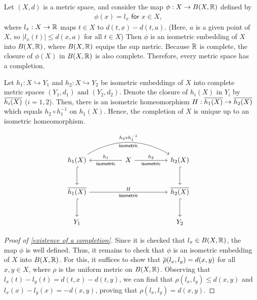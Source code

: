 \begin{thm}\label{existence of a completion}
    Let $(X, d)$ is a metric space, and consider the map $\phi: X\rightarrow B(X, {\mathbb{R}})$ defined by
    \begin{align*}
        \phi(x)=l_x\textsf{ for }x\in X,
    \end{align*}
    where $l_x: X\rightarrow{\mathbb{R}}$ maps $t\in X$ to $d(t, x)-d(t, a)$.
    (Here, $a$ is a given point of $X$, so $|l_x(t)|\leq d(x, a)$ for all $t\in X$)
    Then $\phi$ is an isometric embedding of $X$ into $B(X, {\mathbb{R}})$, where $B(X, {\mathbb{R}})$ equips the sup metric.
    Because ${\mathbb{R}}$ is complete, the closure of $\phi(X)$ in $B(X, {\mathbb{R}})$ is also complete.
    Therefore, every metric space has a completion.
\end{thm}
\begin{thm}\label{uniqueness of a completion}
    Let $h_1: X\hookrightarrow Y_1$ and $h_2: X\hookrightarrow Y_2$ be isometric embeddings of $X$ into complete metric spaces $(Y_1, d_1)$ and $(Y_2, d_2)$.
    Denote the closure of $h_i(X)$ in $Y_i$ by $\overline{h_i(X)}$ ($i=1, 2$).
    Then, there is an isometric homeomorphism $H: \overline{h_1(X)}\rightarrow \overline{h_2(X)}$ which equals $h_2\circ h_1^{-1}$ on $h_1(X)$.
    Hence, the completion of $X$ is unique up to an isometric homeomorphism.

    \begin{equation*}
    \begin{tikzcd}[row sep=large, column sep=huge]
        h_1(X)\arrow[d, hook]
        \arrow[rr, bend left, "h_2\circ h_1^{-1}", "\textsf{isometric}"']
        &
        X
        \arrow[l, "\textsf{isometric}", "h_1"']
        \arrow[r, "h_2", "\textsf{isometric}"']
        &
        h_2(X)\arrow[d, hook]
        \\
        \ol{h_1(X)}
        \arrow[d, hook]
        \arrow[rr, "H", "\textsf{isometric}"']
        &&
        \ol{h_2(X)}
        \arrow[d, hook]
        \\
        Y_1 && Y_2
    \end{tikzcd}
    \end{equation*}
\end{thm}
\begin{proof}[Proof of \cref{existence of a completion}]
    Since it is checked that $l_x\in B(X, {\mathbb{R}})$, the map $\phi$ is well defined.
    Thus, it remains to check that $\phi$ is an isometric embedding of $X$ into $B(X, {\mathbb{R}})$.
    For this, it suffices to show that $\overline{\rho}(l_x, l_y)=d(x, y)$ for all $x, y\in X$, where $\rho$ is the uniform metric on $B(X, {\mathbb{R}})$.
    Observing that $l_x(t)-l_y(t)=d(t, x)-d(t, y)$, we can find that $\rho(l_x, l_y)\leq d(x, y)$ and $l_x(x)-l_y(x)=-d(x, y)$, proving that $\rho(l_x, l_y)=d(x, y)$.
\end{proof}
